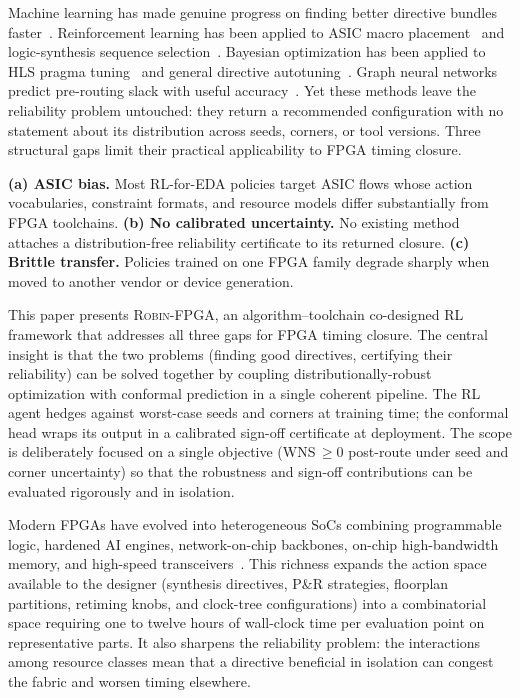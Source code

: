 \documentclass[journal]{IEEEtran}
\begin{document}
Machine learning has made genuine progress on finding better directive bundles faster~\cite{huang2021mleda,ren2022mleda}. Reinforcement learning has been applied to ASIC macro placement~\cite{mirhoseini2021nature,agnesina2023autodmp} and logic-synthesis sequence selection~\cite{hosny2020drills,wang2020gcnrl}. Bayesian optimization has been applied to HLS pragma tuning~\cite{sohrabizadeh2022autodse} and general directive autotuning~\cite{eriksson2019turbo,balandat2020botorch}. Graph neural networks predict pre-routing slack with useful accuracy~\cite{barboza2019net2,guo2022timing}. Yet these methods leave the reliability problem untouched: they return a recommended configuration with no statement about its distribution across seeds, corners, or tool versions. Three structural gaps limit their practical applicability to FPGA timing closure.

\textbf{(a) ASIC bias.} Most RL-for-EDA policies target ASIC flows whose action vocabularies, constraint formats, and resource models differ substantially from FPGA toolchains.
\textbf{(b) No calibrated uncertainty.} No existing method attaches a distribution-free reliability certificate to its returned closure.
\textbf{(c) Brittle transfer.} Policies trained on one FPGA family degrade sharply when moved to another vendor or device generation.

This paper presents \textsc{Robin-FPGA}, an algorithm--toolchain co-designed RL framework that addresses all three gaps for FPGA timing closure. The central insight is that the two problems (finding good directives, certifying their reliability) can be solved together by coupling distributionally-robust optimization with conformal prediction in a single coherent pipeline. The RL agent hedges against worst-case seeds and corners at training time; the conformal head wraps its output in a calibrated sign-off certificate at deployment. The scope is deliberately focused on a single objective (WNS\,$\geq 0$ post-route under seed and corner uncertainty) so that the robustness and sign-off contributions can be evaluated rigorously and in isolation.

Modern FPGAs have evolved into heterogeneous SoCs combining programmable logic, hardened AI engines, network-on-chip backbones, on-chip high-bandwidth memory, and high-speed transceivers~\cite{boutros2021fpga}. This richness expands the action space available to the designer (synthesis directives, P\&R strategies, floorplan partitions, retiming knobs, and clock-tree configurations) into a combinatorial space requiring one to twelve hours of wall-clock time per evaluation point on representative parts. It also sharpens the reliability problem: the interactions among resource classes mean that a directive beneficial in isolation can congest the fabric and worsen timing elsewhere.
\end{document}
